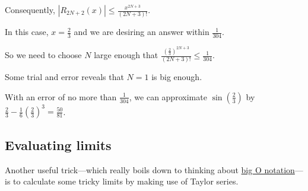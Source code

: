 \documentclass{ximera}
\begin{document}
\begin{question}
\begin{solution}
                \begin{hint}
                  Consequently, \(|R_{2N+2}(x)| \leq \displaystyle\frac{x^{2N+3}}{(2N+3)!}\).
                \end{hint}
                \begin{hint}
                  In this case, \(x = \displaystyle\frac{2}{3}\) and we are desiring an answer within \(\displaystyle\frac{1}{304}\).
                \end{hint}
                \begin{hint}
                  So we need to choose \(N\) large enough that \(\displaystyle\frac{\left(\displaystyle\frac{2}{3}\right)^{2N+3}}{(2N+3)!} \leq \displaystyle\frac{1}{304}\).
                \end{hint}
                \begin{hint}
                  Some trial and error reveals that \(N = 1\) is big enough.
                \end{hint}
                \begin{hint}
                  With an error of no more than \(\displaystyle\frac{1}{304}\), we can approximate \(\sin \left(\displaystyle\frac{2}{3}\right)\) by \(\displaystyle\frac{2}{3} - \displaystyle\frac{1}{6} \left(\displaystyle\frac{2}{3}\right)^3 = \displaystyle\frac{50}{81}\).

                \end{hint}


              \begin{multiple-choice}

              \end{multiple-choice}

              \end{solution}
            \end{question}
            
\subsection{Evaluating limits}

Another useful trick---which really boils down to thinking about  \href{http://en.wikipedia.org/wiki/Big_O_notation}{big O notation}---is to calculate some tricky limits by making use of Taylor series.
\end{document}
